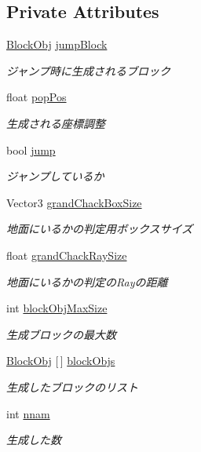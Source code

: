 \subsection*{Private Attributes}
\begin{DoxyCompactItemize}
\item 
\hyperlink{class_block_obj}{Block\+Obj} \hyperlink{class_daruma_aa43a4cc9bcf6dc6366e1a57d90b5fc20}{jump\+Block}
\begin{DoxyCompactList}\small\item\em ジャンプ時に生成されるブロック \end{DoxyCompactList}\item 
float \hyperlink{class_daruma_af120578e4293ca5df91bbb09e79008a7}{pop\+Pos}
\begin{DoxyCompactList}\small\item\em 生成される座標調整 \end{DoxyCompactList}\item 
bool \hyperlink{class_daruma_a9b1546b5bd6c508b5653fd29b02c9c72}{jump}
\begin{DoxyCompactList}\small\item\em ジャンプしているか \end{DoxyCompactList}\item 
Vector3 \hyperlink{class_daruma_af02f116bc08c1312b9cc44e59c23202e}{grand\+Chack\+Box\+Size}
\begin{DoxyCompactList}\small\item\em 地面にいるかの判定用ボックスサイズ \end{DoxyCompactList}\item 
float \hyperlink{class_daruma_a2cdce4139e86673d1280e41c36ef1d99}{grand\+Chack\+Ray\+Size}
\begin{DoxyCompactList}\small\item\em 地面にいるかの判定の\+Rayの距離 \end{DoxyCompactList}\item 
int \hyperlink{class_daruma_a77ede57b08f9ed6a780445675e652002}{block\+Obj\+Max\+Size}
\begin{DoxyCompactList}\small\item\em 生成ブロックの最大数 \end{DoxyCompactList}\item 
\hyperlink{class_block_obj}{Block\+Obj} \mbox{[}$\,$\mbox{]} \hyperlink{class_daruma_acab15ba9721dc0e0225480525cb3ff7a}{block\+Objs}
\begin{DoxyCompactList}\small\item\em 生成したブロックのリスト \end{DoxyCompactList}\item 
int \hyperlink{class_daruma_a0451e247a5f87992857b43cb250f8769}{nnam}
\begin{DoxyCompactList}\small\item\em 生成した数 \end{DoxyCompactList}\end{DoxyCompactItemize}
